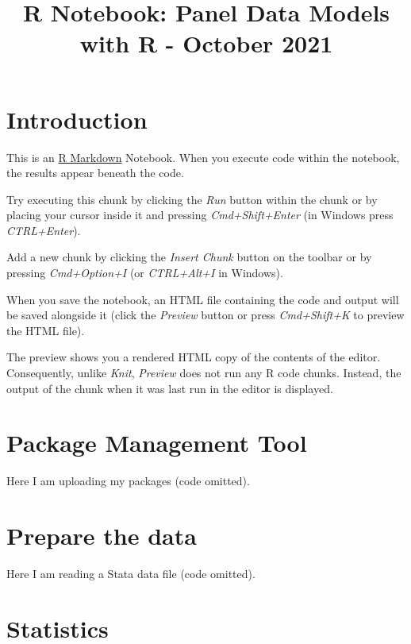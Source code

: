 \documentclass[
]{article}
\title{R Notebook: Panel Data Models with R - October 2021}
\author{}
\date{\vspace{-2.5em}}
\begin{document}
\maketitle

\hypertarget{introduction}{%
\section{Introduction}\label{introduction}}

This is an \href{http://rmarkdown.rstudio.com}{R Markdown} Notebook.
When you execute code within the notebook, the results appear beneath
the code.

Try executing this chunk by clicking the \emph{Run} button within the
chunk or by placing your cursor inside it and pressing
\emph{Cmd+Shift+Enter} (in Windows press \emph{CTRL+Enter}).

Add a new chunk by clicking the \emph{Insert Chunk} button on the
toolbar or by pressing \emph{Cmd+Option+I} (or \emph{CTRL+Alt+I} in
Windows).

When you save the notebook, an HTML file containing the code and output
will be saved alongside it (click the \emph{Preview} button or press
\emph{Cmd+Shift+K} to preview the HTML file).

The preview shows you a rendered HTML copy of the contents of the
editor. Consequently, unlike \emph{Knit}, \emph{Preview} does not run
any R code chunks. Instead, the output of the chunk when it was last run
in the editor is displayed.

\hypertarget{package-management-tool}{%
\section{Package Management Tool}\label{package-management-tool}}

Here I am uploading my packages (code omitted).

\hypertarget{prepare-the-data}{%
\section{Prepare the data}\label{prepare-the-data}}

Here I am reading a Stata data file (code omitted).

\hypertarget{statistics}{%
\section{Statistics}\label{statistics}}
\end{document}
